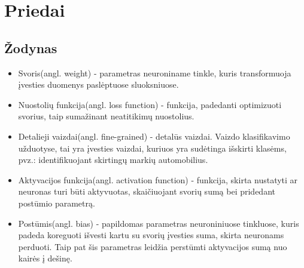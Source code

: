 \documentclass{VUMIFPSkursinis}
\DeclareRobustCommand{\[}{\begin{equation}}
\DeclareRobustCommand{\]}{\end{equation}}
\begin{document}
\section{Priedai}
\thispagestyle{empty} 
\subsection{Žodynas}
\begin{itemize}
\item{Svoris(angl. weight) - parametras neuroniname tinkle, kuris transformuoja įvesties duomenys paslėptuose sluoksniuose.}
\item{Nuostolių funkcija(angl. loss function) - funkcija, padedanti optimizuoti svorius, taip sumažinant neatitikimų nuostolius.}
\item{Detalieji vaizdai(angl. fine-grained) - detalūs vaizdai. Vaizdo klasifikavimo užduotyse, tai yra įvesties vaizdai, kuriuos yra sudėtinga išskirti klasėms, pvz.: identifikuojant skirtingų markių automobilius.}
\item{Aktyvacijos funkcija(angl. activation function) - funkcija, skirta nustatyti ar neuronas turi būti aktyvuotas, skaičiuojant svorių sumą bei pridedant postūmio parametrą.}
\item{Postūmis(angl. bias) - papildomas parametras neuroniniuose tinkluose, kuris padeda koreguoti išvesti kartu su svorių įvesties suma, skirta neuronams perduoti. Taip pat šis parametras leidžia perstūmti aktyvacijos sumą nuo kairės į dešinę.}
\end{itemize} 
\pagebreak

\printbibliography[heading=bibintoc] 
\thispagestyle{empty}
\end{document}
